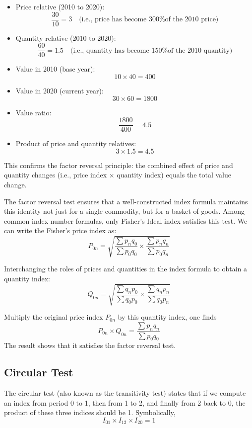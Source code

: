 \documentclass[twoside]{book}
\begin{document}
\begin{itemize}
  \item {Price relative (2010 to 2020):}
  \[
  \dfrac{30}{10} = 3 \quad \text{(i.e., price has become 300\% of the 2010 price)}
  \]

  \item {Quantity relative (2010 to 2020):}
  \[
  \dfrac{60}{40} = 1.5 \quad \text{(i.e., quantity has become 150\% of the 2010 quantity)}
  \]

  \item {Value in 2010 (base year):}
  \[
  10 \times 40 = 400
  \]

  \item {Value in 2020 (current year):}
  \[
  30 \times 60 = 1800
  \]

  \item {Value ratio:}
  \[
  \dfrac{1800}{400} = 4.5
  \]

  \item {Product of price and quantity relatives:}
  \[
  3 \times 1.5 = 4.5
  \]
\end{itemize}

\noindent
This confirms the factor reversal principle: the combined effect of price and quantity changes (i.e., price index $\times$ quantity index) equals the total value change.

The factor reversal test ensures that a well-constructed index formula maintains this identity not just for a single commodity, but for a basket of goods. Among common index number formulas, only Fisher's Ideal index satisfies this test. We can write the Fisher’s price index as:
\[
P_{0n} = \sqrt{\frac{\sum p_n q_0}{\sum p_0 q_0} \times \frac{\sum p_n q_n}{\sum p_0 q_n}}
\]

Interchanging the roles of prices and quantities in the index formula to obtain a quantity index:
\[
Q_{0n} = \sqrt{\frac{\sum q_n p_0}{\sum q_0 p_0} \times \frac{\sum q_n p_n}{\sum q_0 p_n}}
\]

Multiply the original price index \(P_{0n}\) by this quantity index, one finds
\[
P_{0n} \times Q_{0n}
= \frac{\sum p_n q_n}{\sum p_0 q_0}
\]
The result shows that it satisfies the factor reversal test.

\subsection{Circular Test}

The circular test (also known as the transitivity test) states that if we compute an index from period 0 to 1, then from 1 to 2, and finally from 2 back to 0, the product of these three indices should be 1. Symbolically,
\[
   I_{01} \times I_{12} \times I_{20} = 1
\]
\end{document}
